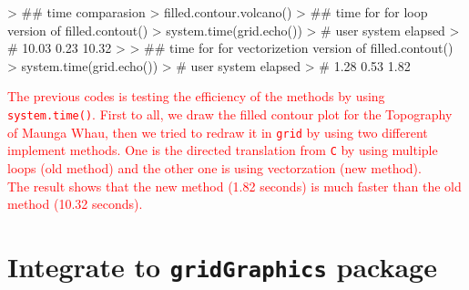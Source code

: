 \documentclass[paper=a4, fontsize=11pt]{report}
\begin{document}
\begin{Schunk}
\begin{Sinput}
> ## time comparasion
> filled.contour.volcano()
> ## time for for loop version of filled.contout()
> system.time(grid.echo())
> # user  system elapsed 
> # 10.03    0.23   10.32 
> 
> ## time for for vectorizetion version of filled.contout()
> system.time(grid.echo())
> # user  system elapsed 
> # 1.28    0.53    1.82 
\end{Sinput}
\end{Schunk}

\textcolor{red}{
	The previous codes is testing the efficiency of the methods by using \texttt{system.time()}. First to all, we draw the filled contour plot for the Topography of Maunga Whau, then we tried to redraw it in \texttt{grid} by using two different implement methods. One is the directed translation from \texttt{C} by using multiple loops (old method) and the other one is using vectorzation (new method).\\
	The result shows that the new method (1.82 seconds) is much faster than the old method (10.32 seconds).
}
\chapter{Integrate to \texttt{gridGraphics} package}
\end{document}
